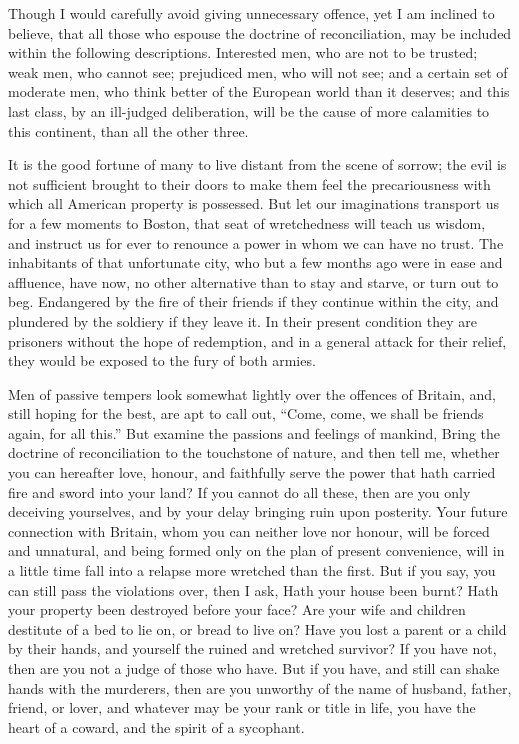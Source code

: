 \documentclass[12pt,oneside]{memoir}
\begin{document}
Though I would carefully avoid giving unnecessary offence, yet I am inclined to believe, that all those who espouse the doctrine of reconciliation, may be included within the following descriptions. Interested men, who are not to be trusted; weak men, who cannot see; prejudiced men, who will not see; and a certain set of moderate men, who think better of the European world than it deserves; and this last class, by an ill-judged deliberation, will be the cause of more calamities to this continent, than all the other three.

It is the good fortune of many to live distant from the scene of sorrow; the evil is not sufficient brought to their doors to make them feel the precariousness with which all American property is possessed. But let our imaginations transport us for a few moments to Boston, that seat of wretchedness will teach us wisdom, and instruct us for ever to renounce a power in whom we can have no trust. The inhabitants of that unfortunate city, who but a few months ago were in ease and affluence, have now, no other alternative than to stay and starve, or turn out to beg. Endangered by the fire of their friends if they continue within the city, and plundered by the soldiery if they leave it. In their present condition they are prisoners without the hope of redemption, and in a general attack for their relief, they would be exposed to the fury of both armies.

Men of passive tempers look somewhat lightly over the offences of Britain, and, still hoping for the best, are apt to call out, ``Come, come, we shall be friends again, for all this.'' But examine the passions and feelings of mankind, Bring the doctrine of reconciliation to the touchstone of nature, and then tell me, whether you can hereafter love, honour, and faithfully serve the power that hath carried fire and sword into your land? If you cannot do all these, then are you only deceiving yourselves, and by your delay bringing ruin upon posterity. Your future connection with Britain, whom you can neither love nor honour, will be forced and unnatural, and being formed only on the plan of present convenience, will in a little time fall into a relapse more wretched than the first. But if you say, you can still pass the violations over, then I ask, Hath your house been burnt? Hath your property been destroyed before your face? Are your wife and children destitute of a bed to lie on, or bread to live on? Have you lost a parent or a child by their hands, and yourself the ruined and wretched survivor? If you have not, then are you not a judge of those who have. But if you have, and still can shake hands with the murderers, then are you unworthy of the name of husband, father, friend, or lover, and whatever may be your rank or title in life, you have the heart of a coward, and the spirit of a sycophant.
\end{document}
